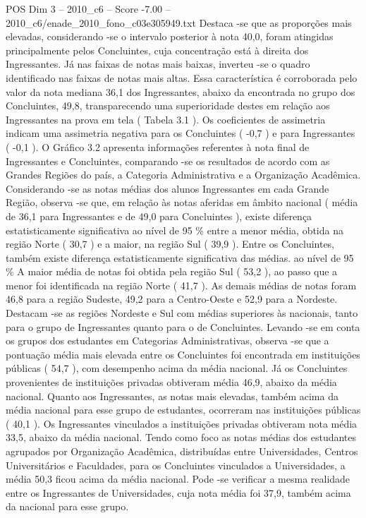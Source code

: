\begin{textsample}{POS Dim 3 – 2010\_c6 – Score -7.00 – 2010\_c6/enade\_2010\_fono\_c03e305949.txt}
Destaca -se que as proporções mais elevadas, considerando -se o intervalo posterior à nota 40,0, foram atingidas principalmente pelos Concluintes, cuja concentração está à direita dos Ingressantes.
Já nas faixas de notas mais baixas, inverteu -se o quadro identificado nas faixas de notas mais altas.
Essa característica é corroborada pelo valor da nota mediana 36,1 dos Ingressantes, abaixo da encontrada no grupo dos Concluintes, 49,8, transparecendo uma superioridade destes em relação aos Ingressantes na prova em tela ( Tabela 3.1 ).
Os coeficientes de assimetria indicam uma assimetria negativa para os Concluintes ( -0,7 ) e para Ingressantes ( -0,1 ).
O Gráfico 3.2 apresenta informações referentes à nota final de Ingressantes e Concluintes, comparando -se os resultados de acordo com as Grandes Regiões do país, a Categoria Administrativa e a Organização Acadêmica.
Considerando -se as notas médias dos alunos Ingressantes em cada Grande Região, observa -se que, em relação às notas aferidas em âmbito nacional ( média de 36,1 para Ingressantes e de 49,0 para Concluintes ), existe diferença estatisticamente significativa ao nível de 95 \% entre a menor média, obtida na região Norte ( 30,7 ) e a maior, na região Sul ( 39,9 ).
Entre os Concluintes, também existe diferença estatisticamente significativa das médias. ao nível de 95 \% A maior média de notas foi obtida pela região Sul ( 53,2 ), ao passo que a menor foi identificada na região Norte ( 41,7 ).
As demais médias de notas foram 46,8 para a região Sudeste, 49,2 para a Centro-Oeste e 52,9 para a Nordeste.
Destacam -se as regiões Nordeste e Sul com médias superiores às nacionais, tanto para o grupo de Ingressantes quanto para o de Concluintes.
Levando -se em conta os grupos dos estudantes em Categorias Administrativas, observa -se que a pontuação média mais elevada entre os Concluintes foi encontrada em instituições públicas ( 54,7 ), com desempenho acima da média nacional.
Já os Concluintes provenientes de instituições privadas obtiveram média 46,9, abaixo da média nacional.
Quanto aos Ingressantes, as notas mais elevadas, também acima da média nacional para esse grupo de estudantes, ocorreram nas instituições públicas ( 40,1 ).
Os Ingressantes vinculados a instituições privadas obtiveram nota média 33,5, abaixo da média nacional.
Tendo como foco as notas médias dos estudantes agrupados por Organização Acadêmica, distribuídas entre Universidades, Centros Universitários e Faculdades, para os Concluintes vinculados a Universidades, a média 50,3 ficou acima da média nacional.
Pode -se verificar a mesma realidade entre os Ingressantes de Universidades, cuja nota média foi 37,9, também acima da nacional para esse grupo.

\end{textsample}
